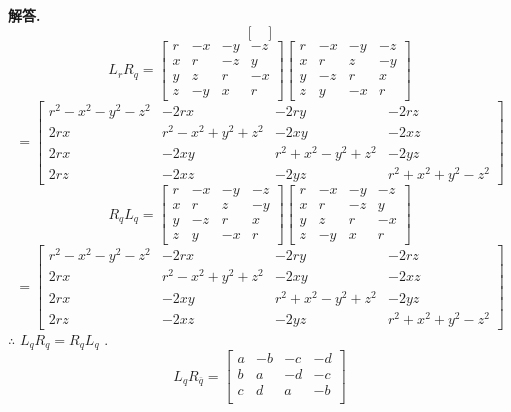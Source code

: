 \documentclass[12pt, a4paper, oneside]{article}
\newenvironment{solution}{\par\noindent\textbf{解答. }}{\par}
\begin{document}
\begin{CJK}{UTF8}{gbsn}
\begin{solution}
$$\begin{bmatrix}
  \end{bmatrix}$$
  $$ L_rR_q = \begin{bmatrix}
    r & -x & -y & -z \\ 
    x & r & -z & y \\
    y & z & r & -x \\
    z & -y & x & r
  \end{bmatrix}\begin{bmatrix}
    r & -x & -y & -z \\
    x & r & z & -y \\ 
    y & -z & r & x \\ 
    z & y & -x & r
  \end{bmatrix} $$
  $$ = \begin{bmatrix}
    r^2 - x^2 - y^2 - z^2 & -2rx & -2ry & -2rz \\
    2rx & r^2 -x^2+y^2 + z^2 & -2xy & -2xz \\ 
    2rx & -2xy  & r^2+x^2 -y^2 + z^2 & - 2yz \\ 
    2rz & -2xz & -2yz & r^2 + x^2 + y^2  - z^2
   \end{bmatrix} $$
  $$ R_qL_q = \begin{bmatrix}
    r & -x & -y & -z \\
    x & r & z & -y \\ 
    y & -z & r & x \\ 
    z & y & -x & r
  \end{bmatrix} \begin{bmatrix}
    r & -x & -y & -z \\ 
    x & r & -z & y \\
    y & z & r & -x \\
    z & -y & x & r
  \end{bmatrix} $$ 
  $$ = \begin{bmatrix}
    r^2 - x^2 - y^2 - z^2 & -2rx & -2ry & -2rz \\
    2rx & r^2 -x^2+y^2 + z^2 & -2xy & -2xz \\ 
    2rx & -2xy  & r^2+x^2 -y^2 + z^2 & - 2yz \\ 
    2rz & -2xz & -2yz & r^2 + x^2 + y^2  - z^2
   \end{bmatrix} $$
  $\therefore$ $L_qR_q = R_qL_q$ . 
  $$ L_qR_{\bar{q}} = \begin{bmatrix}
    a & -b & -c & -d \\
    b & a & -d & -c \\
    c & d & a & -b \\

\end{bmatrix}$$
\end{solution}
\end{CJK}
\end{document}

